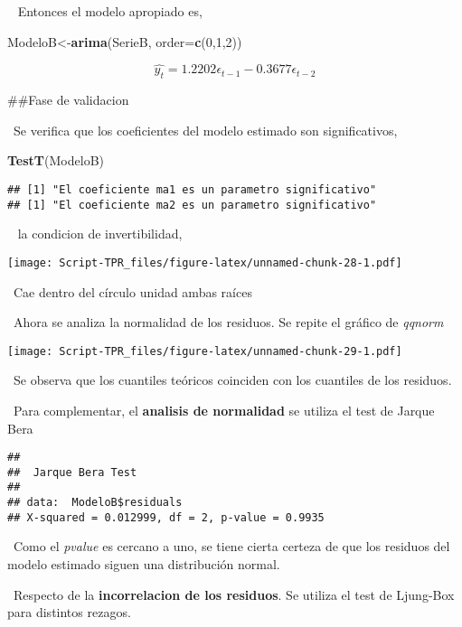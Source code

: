 \documentclass[]{article}
\newenvironment{Shaded}{\begin{snugshade}}{\end{snugshade}}
\newcommand{\DataTypeTok}[1]{\textcolor[rgb]{0.13,0.29,0.53}{#1}}
\newcommand{\DecValTok}[1]{\textcolor[rgb]{0.00,0.00,0.81}{#1}}
\newcommand{\KeywordTok}[1]{\textcolor[rgb]{0.13,0.29,0.53}{\textbf{#1}}}
\newcommand{\NormalTok}[1]{#1}
\begin{document}
~ Entonces el modelo apropiado es,

\begin{Shaded}
\begin{Highlighting}[]
\NormalTok{ModeloB<-}\KeywordTok{arima}\NormalTok{(SerieB, }\DataTypeTok{order=}\KeywordTok{c}\NormalTok{(}\DecValTok{0}\NormalTok{,}\DecValTok{1}\NormalTok{,}\DecValTok{2}\NormalTok{))}
\end{Highlighting}
\end{Shaded}

\[\hat{y_t}=1.2202\epsilon_{t-1}-0.3677\epsilon_{t-2}\]

\#\#Fase de validacion

~Se verifica que los coeficientes del modelo estimado son
significativos,

\begin{Shaded}
\begin{Highlighting}[]
\KeywordTok{TestT}\NormalTok{(ModeloB)}
\end{Highlighting}
\end{Shaded}

\begin{verbatim}
## [1] "El coeficiente ma1 es un parametro significativo"
## [1] "El coeficiente ma2 es un parametro significativo"
\end{verbatim}

~ la condicion de invertibilidad,

\texttt{[image: Script-TPR\_files/figure-latex/unnamed-chunk-28-1.pdf]}

~Cae dentro del círculo unidad ambas raíces

~Ahora se analiza la normalidad de los residuos. Se repite el gráfico de
\emph{qqnorm}

\texttt{[image: Script-TPR\_files/figure-latex/unnamed-chunk-29-1.pdf]}

~Se observa que los cuantiles teóricos coinciden con los cuantiles de
los residuos.

~Para complementar, el \textbf{analisis de normalidad} se utiliza el
test de Jarque Bera

\begin{verbatim}
## 
##  Jarque Bera Test
## 
## data:  ModeloB$residuals
## X-squared = 0.012999, df = 2, p-value = 0.9935
\end{verbatim}

~Como el \emph{pvalue} es cercano a uno, se tiene cierta certeza de que
los residuos del modelo estimado siguen una distribución normal.

~Respecto de la \textbf{incorrelacion de los residuos}. Se utiliza el
test de Ljung-Box para distintos rezagos.
\end{document}
